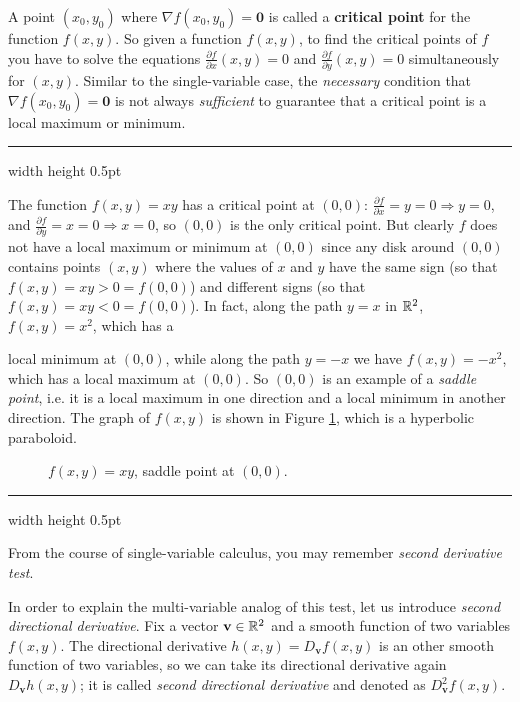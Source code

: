 A point $(x_0,y_0)$ where $\nabla f (x_0,y_0) = \textbf{0}$ is called a \textbf{critical point} for the function $f(x,y)$.
So given a function $f(x,y)$, to find the critical points of $f$ you have to solve the equations
$\frac{\partial f}{\partial x}(x,y) = 0$ and $\frac{\partial f}{\partial y}(x,y) = 0$ simultaneously for $(x,y)$.
Similar to the single-variable case, the \emph{necessary} condition that $\nabla f (x_0,y_0) = \textbf{0}$ is not always
\emph{sufficient} to guarantee that a critical point is a local maximum or minimum.

\medskip
\hrule width \textwidth height 0.5pt
\begin{exmp}
 The function $f(x,y) = xy$ has a critical point at $(0,0)$: $\frac{\partial f}{\partial x} = y = 0 \Rightarrow y=0$,
 and $\frac{\partial f}{\partial y} = x = 0 \Rightarrow x=0$, so $(0,0)$ is the only critical point. But clearly $f$
 does not have a local maximum or minimum at $(0,0)$ since any disk around $(0,0)$ contains points $(x,y)$ where the
 values of $x$ and $y$ have the same sign (so that $f(x,y) = xy > 0 = f(0,0)$) and different signs (so that $f(x,y) =
 xy < 0 = f(0,0)$). In fact, along the path $y=x$ in $\mathbb{R}^{2}$, $f(x,y) = x^2$, which has a

\noindent local minimum at $(0,0)$,
 while along the path $y=-x$ we have $f(x,y)=-x^2$, which has a local maximum at $(0,0)$. So $(0,0)$ is an example of a
 \emph{saddle point}, i.e. it is a local maximum in one direction and a local minimum in another direction. The graph
 of $f(x,y)$ is shown in Figure \ref{fig:xy}, which is a hyperbolic paraboloid.
\end{exmp}
\begin{figure}[h]
 \begin{center}
  
 \end{center}
 \caption[]{\quad $f(x,y) = xy$, saddle point at $(0,0)$.}
 \label{fig:xy}
\end{figure}
\hrule width \textwidth height 0.5pt

\medskip

From the course of single-variable calculus, you may remember \emph{second derivative test}.


In order to explain the multi-variable analog of this test,
let us introduce \emph{second directional derivative}. 
Fix a vector $\textbf{v}\in\mathbb{R}^{2}$ and a smooth function of two variables $f(x,y)$.
The directional derivative $h(x,y)=D_{\textbf{v}}f(x,y)$ is an other smooth function of two variables, so we can take its directional derivative again 
$D_{\textbf{v}}h(x,y)$;
it is called \emph{second directional derivative} and denoted as $D_{\textbf{v}}^2f(x,y)$.

